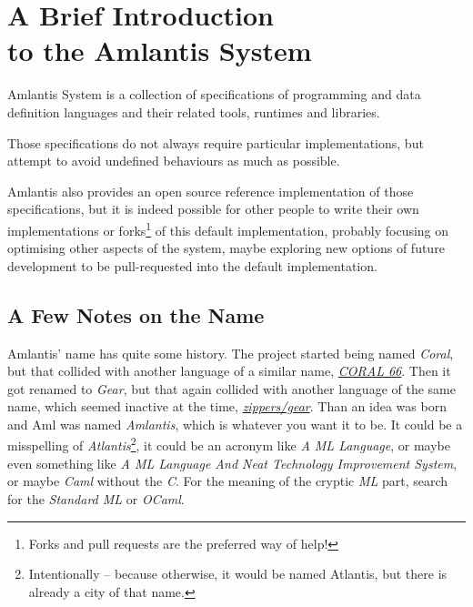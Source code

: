 
\chapter[A Brief Introduction to the Amlantis System]{A Brief Introduction \\ to the Amlantis System}
\label{sec:brief-intro}

Amlantis System is a collection of specifications of programming and data definition languages and their related tools, runtimes and libraries. 

Those specifications do not always require particular implementations, but attempt to avoid undefined behaviours as much as possible. 

Amlantis also provides an open source reference implementation of those specifications, but it is indeed possible for other people to write their own implementations or forks\footnote{Forks and pull requests are the preferred way of help!} of this default implementation, probably focusing on optimising other aspects of the system, maybe exploring new options of future development to be pull-requested into the default implementation. 





\section*{A Few Notes on the Name}

Amlantis' name has quite some history. The project started being named {\em Coral}, but that collided with another language of a similar name, \href{https://en.wikipedia.org/wiki/Coral_66}{{\em CORAL 66}}. Then it got renamed to {\em Gear}, but that again collided with another language of the same name, which seemed inactive at the time, \href{https://github.com/zippers/gear}{{\em zippers/gear}}. Than an idea was born and Aml was named {\em Amlantis}, which is whatever you want it to be. It could be a misspelling of {\em Atlantis}\footnote{Intentionally -- because otherwise, it would be named Atlantis, but there is already a city of that name.}, it could be an acronym like {\em A ML Language}, or maybe even something like {\em A ML Language And Neat Technology Improvement System}, or maybe {\em Caml} without the {\em C}. For the meaning of the cryptic {\em ML} part, search for the {\em Standard ML} or {\em OCaml}. 





